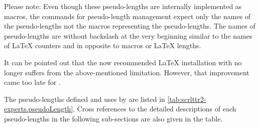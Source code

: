 Please note: Even though these pseudo-lengths are
internally implemented as macros, the commands for pseudo-length management
expect only the names of the pseudo-lengths not the macros representing the
pseudo-lengths. The names of pseudo-lengths are without backslash at the very
beginning similar to the names of \LaTeX{} counters and in opposite to macros
or \LaTeX{} lengths.

It can be pointed out that the now recommended {\LaTeX} installation with
{\eTeX} no longer suffers from the above-mentioned limitation. However, that
improvement came too late for .

The pseudo-lengths defined and uses by  are listed in
\autoref{tab:scrlttr2-experts.pseudoLength}. Cross references to the detailed
descriptions of each pseudo-lengths in the following sub-sections are also
given in the table.

